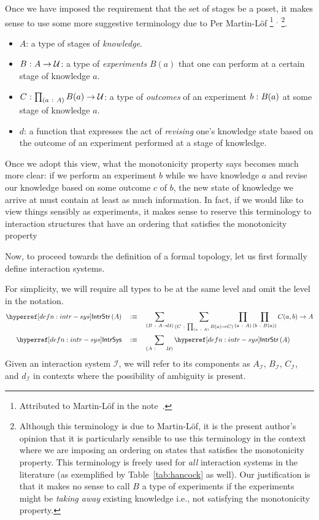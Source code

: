Once we have imposed the requirement that the set of stages be a poset, it makes sense to
use some more suggestive terminology due to Per Martin-Löf
\footnote{%
  Attributed to Martin-Löf in the note~\cite{coq-posets}.
}%
$^{,}$%
\footnote{%
  Although this terminology is due to Martin-Löf, it is the present author's opinion that
  it is particularly sensible to use this terminology in the context where we are imposing
  an ordering on states that satisfies the monotonicity property. This terminology is
  freely used for \emph{all} interaction systems in the literature (as exemplified by
  Table~\ref{tab:hancock} as well). Our justification is that it makes no sense to call
  $B$ a type of experiments if the experiments might be \emph{taking away} existing
  knowledge i.e., not satisfying the monotonicity property.
}.
\begin{itemize}
  \item $A$: a type of stages of \emph{knowledge}.
  \item $B\hspace{0.1mm}:\hspace{0.1mm}A \rightarrow \mathcal{U}{}$: a type of \emph{experiments} $B(a)$ that one can perform
    at a certain stage of knowledge $a$.
  \item $C\hspace{0.1mm}:\hspace{0.1mm}\prod_{(a~:~A)} B(a) \rightarrow \mathcal{U}{}$: a type of \emph{outcomes} of an
    experiment $b\hspace{0.1mm}:\hspace{0.1mm}B(a)$ at some stage of knowledge $a$.
  \item $d$: a function that expresses the act of \emph{revising} one's knowledge state
    based on the outcome of an experiment performed at a stage of knowledge.
\end{itemize}

Once we adopt this view, what the monotonicity property says becomes much more clear: if
we perform an experiment $b$ while we have knowledge $a$ and revise our knowledge based on
some outcome $c$ of $b$, the new state of knowledge we arrive at must contain at least as
much information. In fact, if we would like to view things sensibly as experiments, it
makes sense to reserve this terminology to interaction structures that have an ordering
that satisfies the monotonicity property

Now, to proceed towards the definition of a formal topology, let us first formally define
interaction systems.
\begin{defn}\label{defn:intr-sys}
  For simplicity, we will require all types to be at the same level and omit the level
  in the notation.
  \begin{align*}
    \treestr{A} &\quad\is\quad
      \sigmaty{B}{A \rightarrow \univ}{
        \sigmaty{C}{\pity{a}{A}{B(a) \rightarrow C}}{
          \pity{a}{A}{\pity{b}{B(a)}{C(a, b) \rightarrow A}}
        }
      }\\
    \intrsys{} &\quad\is\quad \sigmaty{A}{~~~~\univ}{\treestr{A}}
  \end{align*}
  Given an interaction system $\mathcal{I}$, we will refer to its components as
  $A_{\mathcal{I}}$, $B_{\mathcal{I}}$, $C_{\mathcal{I}}$, and $d_{\mathcal{I}}$ in
  contexts where the possibility of ambiguity is present.
\end{defn}

